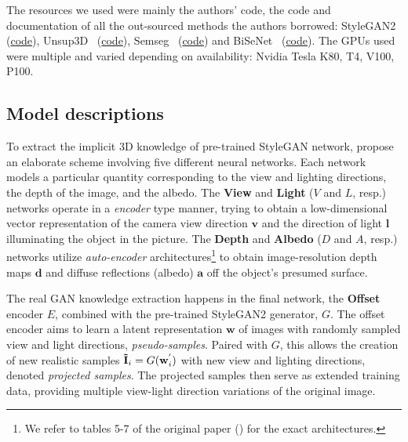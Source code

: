The resources we used were mainly the authors' code, the code and documentation of all the out-sourced methods the authors borrowed: StyleGAN2~\cite{stylegan2} (\href{https://github.com/rosinality/stylegan2-pytorch}{code}), Unsup3D~\cite{wu2020unsupervised} (\href{https://github.com/elliottwu/unsup3d}{code}), Semseg~\cite{semseg2019} (\href{https://github.com/hszhao/semseg}{code}) and BiSeNet~\cite{bisenet, bisenet2} (\href{https://github.com/zllrunning/face-parsing.PyTorch}{code}). The GPUs used were multiple and varied depending on availability: Nvidia Tesla K80, T4, V100, P100.

\subsection{Model descriptions}
To extract the implicit 3D knowledge of pre-trained StyleGAN network, \cite{gan2shape} propose an elaborate scheme involving five different neural networks. Each network models a particular quantity corresponding to the view and lighting directions, the depth of the image, and the albedo. The \textbf{View} and \textbf{Light} ($V$ and $L$, resp.) networks operate in a \textit{encoder} type manner, trying to obtain a low-dimensional vector representation of the camera view direction $\mathbf{v}$ and the direction of light $\mathbf{l}$ illuminating the object in the picture. 
The \textbf{Depth} and \textbf{Albedo} ($D$ and $A$, resp.) networks utilize \textit{auto-encoder} architectures\footnote{We refer to tables 5-7 of the original paper (\cite{gan2shape}) for the exact architectures.} to obtain image-resolution depth maps $\mathbf{d}$ and diffuse reflections (albedo) $\mathbf{a}$ off the object's presumed surface.

The real GAN knowledge extraction happens in the final network, the \textbf{Offset} encoder $E$, combined with the pre-trained StyleGAN2 generator, $G$. The offset encoder aims to learn a latent representation $\mathbf{w}$ of images with randomly sampled view and light directions, \textit{pseudo-samples}.
Paired with $G$, this allows the creation of new realistic samples $\mathbf{\Tilde{I}}_i = G(\mathbf{w}^{'}_{i})$ with new view and lighting directions, denoted \textit{projected samples}.
The projected samples then serve as extended training data, providing multiple view-light direction variations of the original image.

